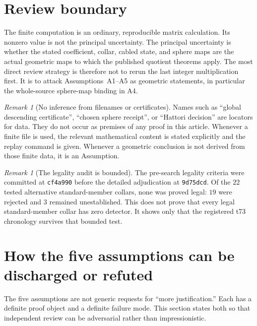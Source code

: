 \documentclass[10pt,reqno]{amsart}
\theoremstyle{definition}
\theoremstyle{remark}
\newtheorem{remark}[theorem]{Remark}
\begin{document}
\section{Review boundary}\label{sec:review-boundary}

The finite computation is an ordinary, reproducible matrix calculation.  Its
nonzero value is not the principal uncertainty.  The principal uncertainty
is whether the stated coefficient, collar, cabled state, and sphere maps are
the actual geometric maps to which the published quotient theorems apply.
The most direct review strategy is therefore not to rerun the last integer
multiplication first.  It is to attack Assumptions~A1--A5 as geometric
statements, in particular the whole-source sphere-map binding in A4.

\begin{remark}[No inference from filenames or certificates]\label{rem:no-certificate-proof}
Names such as ``global descending certificate'', ``chosen sphere receipt'',
or ``Hattori decision'' are locators for data.  They do not occur as premises
of any proof in this article.  Whenever a finite file is used, the relevant
mathematical content is stated explicitly and the replay command is given.
Whenever a geometric conclusion is not derived from those finite data, it is
an Assumption.
\end{remark}

\begin{remark}[The legality audit is bounded]\label{rem:legality-bounded}
The pre-search legality criteria were committed at
\texttt{cf4a990} before the detailed adjudication at
\texttt{9d75dcd}.  Of the $22$ tested alternative standard-member collars,
none was proved legal: $19$ were rejected and $3$ remained unestablished.
This does not prove that every legal standard-member collar has zero detector.
It shows only that the registered t73 chronology survives that bounded test.
\end{remark}

\section{How the five assumptions can be discharged or refuted}\label{sec:assumption-tests}

The five assumptions are not generic requests for ``more justification.''
Each has a definite proof object and a definite failure mode.  This section
states both so that independent review can be adversarial rather than
impressionistic.
\end{document}
